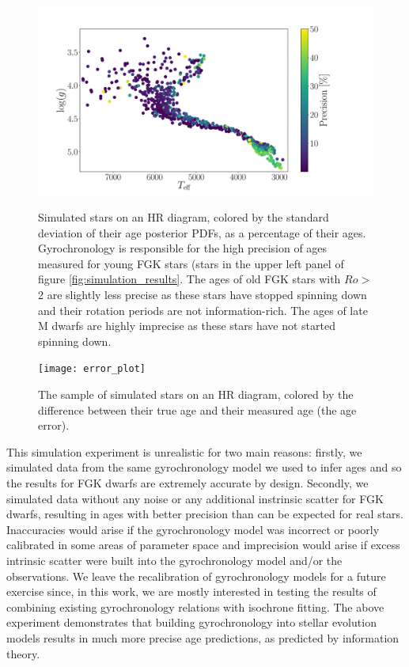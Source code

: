 \begin{figure}
  \caption{
Simulated stars on an HR diagram, colored by the standard deviation of their
    age posterior PDFs, as a percentage of their ages.
Gyrochronology is responsible for the high precision of ages measured for
    young FGK stars (stars in the upper left panel of figure
    \ref{fig:simulation_results}.
The ages of old FGK stars with $Ro > $2 are slightly less precise as these
    stars have stopped spinning down and their rotation periods are not
    information-rich.
The ages of late M dwarfs are highly imprecise as these stars have not started
    spinning down.
}
  \centering
    \includegraphics[width=1\textwidth]{precision_plot}
\label{fig:precision}
\end{figure}

\begin{figure}
  \caption{
The sample of simulated stars on an HR diagram, colored by the difference
    between their true age and their measured age (the age error).
}
  \centering
    \texttt{[image: error\_plot]}
\label{fig:accuracy}
\end{figure}


This simulation experiment is unrealistic for two main reasons: firstly, we
simulated data from the same gyrochronology model we used to infer ages and so
the results for FGK dwarfs are extremely accurate by design.
Secondly, we simulated data without any noise or any additional instrinsic
scatter for FGK dwarfs, resulting in ages with better precision than can be
expected for real stars.
Inaccuracies would arise if the gyrochronology model was incorrect or poorly
calibrated in some areas of parameter space and imprecision would arise if
excess intrinsic scatter were built into the gyrochronology model and/or the
observations.
We leave the recalibration of gyrochronology models for a future exercise
since, in this work, we are mostly interested in testing the results of
combining existing gyrochronology relations with isochrone fitting.
The above experiment demonstrates that building gyrochronology into stellar
evolution models results in much more precise age predictions, as predicted by
information theory.

